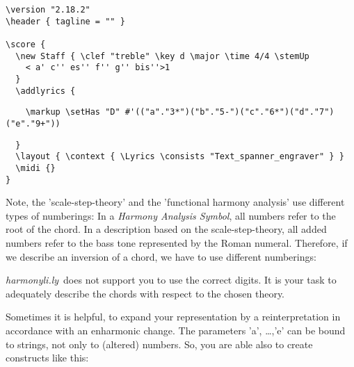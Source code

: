 \documentclass[
  DIV=calc,
  BCOR=5mm,
  12pt,
  headings=small,
  oneside,
  abstract=true,
  toc=bib,
  xcolor=dvipsnames,
  openany,
  ngerman,english]{scrartcl}
\newcommand{\hlyn}[0]{\textit{harmonyli.ly}}
\newcommand{\has}[1]{\textit{Harmony Analysis Symbol#1}}
\begin{document}
\begin{scriptsize}
\begin{verbatim}
\version "2.18.2"
\header { tagline = "" }

\score {
  \new Staff { \clef "treble" \key d \major \time 4/4 \stemUp 
    < a' c'' es'' f'' g'' bis''>1 
  }
  \addlyrics {
  \end{verbatim}
  { \color{red} \verb|    \markup \setHas "D" #'(("a"."3*")("b"."5-")("c"."6*")("d"."7")("e"."9+")) |
  }
\begin{verbatim}    
  }
  \layout { \context { \Lyrics \consists "Text_spanner_engraver" } }
  \midi {}
}
\end{verbatim}
\end{scriptsize}

Note, the 'scale-step-theory' and the 'functional harmony analysis' use
different types of numberings: In a \has{}, all numbers refer to the root of the
chord. In a description based on the scale-step-theory, all added numbers refer
to the bass tone represented by the Roman numeral. Therefore, if we describe an
inversion of a chord, we have to use different numberings:

\begin{center}
\end{center}

\hlyn\ does not support you to use the correct digits. It is your task
to adequately describe the chords with respect to the chosen theory.

Sometimes it is helpful, to expand your representation by a reinterpretation in
accordance with an enharmonic change. The parameters 'a', \ldots,'e' can be bound
to strings, not only to (altered) numbers. So, you are able also to create
constructs like this:

\begin{center}
\end{center}
\end{document}
